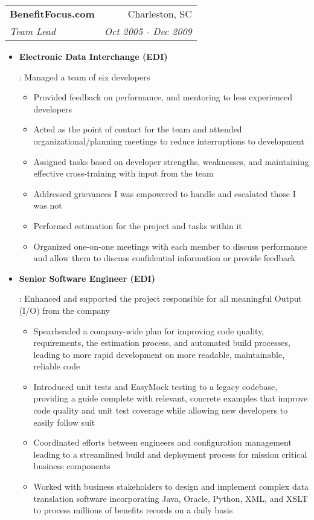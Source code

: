 \documentclass[letterpaper,10pt]{article}
\makeatletter
\newcommand{\resumeItem}[2]{
  \item\small{
    \textbf{#1}{: #2 \vspace{-2pt}}
  }
}
\newcommand{\resumeSubheading}[4]{
  \vspace{-1pt}\item[]
  \begin{tabular*}{0.98\textwidth}{l@{\extracolsep{\fill}}r}
      \hspace{-10pt}\textbf{#1} & #2 \\
      \hspace{-10pt}\textit{\small#3} & \textit{\small #4} \\
    \end{tabular*}\vspace{-5pt}
}
\newcommand{\resumeItemListStart}{\begin{itemize}}
\newcommand{\resumeItemListEnd}{\end{itemize}\vspace{-5pt}}
\makeatother
\begin{document}
    \resumeSubheading
      {BenefitFocus.com}{Charleston, SC}
      {Team Lead}{Oct 2005 - Dec 2009}
      \resumeItemListStart
        \resumeItem{Electronic Data Interchange (EDI)}
          {Managed a team of six developers
            \begin{itemize}
            \item Provided feedback on performance, and mentoring to less experienced developers
            \item Acted as the point of contact for the team and attended organizational/planning meetings to reduce interruptions to development
            \item Assigned tasks based on developer strengths, weaknesses, and maintaining effective cross-training with input from the team
            \item Addressed grievances I was empowered to handle and escalated those I was not
            \item Performed estimation for the project and tasks within it
            \item Organized one-on-one meetings with each member to discuss performance and allow them to discuss confidential information or provide feedback
            \end{itemize}
          }
        \resumeItem{Senior Software Engineer (EDI)}
          {Enhanced and supported the project responsible for all meaningful Output (I/O) from the company
            \begin{itemize}
            \item Spearheaded a company-wide plan for improving code quality, requirements, the estimation process, and automated build processes, leading to more rapid development on more readable, maintainable, reliable code
            \item Introduced unit tests and EasyMock testing to a legacy codebase, providing a guide complete with relevant, concrete examples that improve code quality and unit test coverage while allowing new developers to easily follow suit
            \item Coordinated efforts between engineers and configuration management leading to a streamlined build and deployment process for mission critical business components
            \item Worked with business stakeholders to design and implement complex data translation software incorporating Java, Oracle, Python, XML, and XSLT to process millions of benefits records on a daily basis
            \end{itemize}
          }
      \resumeItemListEnd
\end{document}
